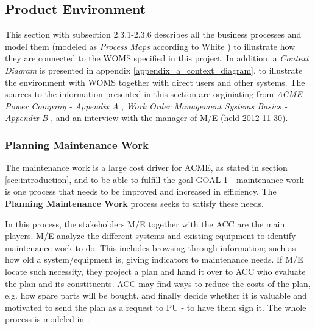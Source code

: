 \subsection{Product Environment}
\label{sec:product_environment}
This section with subsection 2.3.1-2.3.6 describes all the business processes and model them (modeled as \emph{Process Maps} according to White \cite{bpmn}) to illustrate how they are connected to the WOMS specified in this project. In addition, a \emph{Context Diagram} is presented in appendix \ref{appendix_a_context_diagram}, to illustrate the environment with WOMS together with direct users and other systems. The sources to the information presented in this section are orginiating from \emph{ACME Power Company - Appendix A} \cite{A}, \emph{Work Order Management Systems Basics - Appendix B} \cite{B}, and an interview with the manager of M/E (held 2012-11-30).
\subsubsection{Planning Maintenance Work}
\label{sec:bp1}
The maintenance work is a large cost driver for ACME, as stated in section \ref{sec:introduction}, and to be able to fulfill the goal GOAL-1 - maintenance work is one process that needs to be improved and increased in efficiency. The \textbf{Planning Maintenance Work} process seeks to satisfy these needs. 

In this process, the stakeholders M/E together with the ACC are the main players. M/E analyze the different systems and existing equipment to identify maintenance work to do. This includes browsing through information; such as how old a system/equipment is, giving indicators to maintenance needs. If M/E locate such necessity, they project a plan and hand it over to ACC who evaluate the plan and its constituents. ACC may find ways to reduce the costs of the plan, e.g. how spare parts will be bought, and finally decide whether it is valuable and motivated to send the plan as a request to PU - to have them sign it. The whole process is modeled in .

